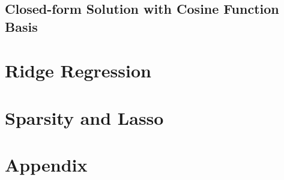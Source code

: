 \documentclass{article}
\begin{document}
\subsection{Closed-form Solution with Cosine Function Basis}

\section{Ridge Regression}

\section{Sparsity and Lasso}

\section{Appendix}
\end{document}
